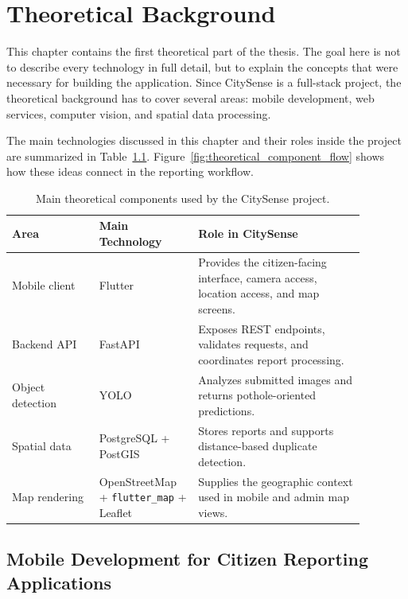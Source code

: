 \chapter{Theoretical Background}

This chapter contains the first theoretical part of the thesis. The goal here is not to describe every technology in full detail, but to explain the concepts that were necessary for building the application. Since CitySense is a full-stack project, the theoretical background has to cover several areas: mobile development, web services, computer vision, and spatial data processing.

The main technologies discussed in this chapter and their roles inside the project are summarized in Table~\ref{tab:theoretical_foundations}. Figure~\ref{fig:theoretical_component_flow} shows how these ideas connect in the reporting workflow.

\begin{table}[htbp]
\centering
\begin{tabular}{>{\raggedright\arraybackslash}p{0.22\linewidth} >{\raggedright\arraybackslash}p{0.24\linewidth} >{\raggedright\arraybackslash}p{0.42\linewidth}}
\toprule
\textbf{Area} & \textbf{Main Technology} & \textbf{Role in CitySense} \\
\midrule
Mobile client & Flutter & Provides the citizen-facing interface, camera access, location access, and map screens. \\
Backend API & FastAPI & Exposes REST endpoints, validates requests, and coordinates report processing. \\
Object detection & YOLO & Analyzes submitted images and returns pothole-oriented predictions. \\
Spatial data & PostgreSQL + PostGIS & Stores reports and supports distance-based duplicate detection. \\
Map rendering & OpenStreetMap + \texttt{flutter\_map} + Leaflet & Supplies the geographic context used in mobile and admin map views. \\
\bottomrule
\end{tabular}
\caption{Main theoretical components used by the CitySense project.}
\label{tab:theoretical_foundations}
\end{table}

\section{Mobile Development for Citizen Reporting Applications}

